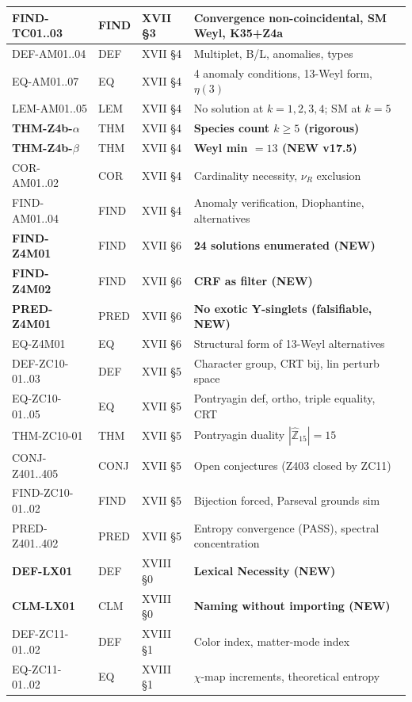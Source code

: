 \documentclass[12pt, a4paper]{article}
\begin{document}
\begin{center}
{\begin{longtable}{p{3.5cm} p{2.0cm} p{2.5cm} p{4.5cm}}
FIND-TC01..03   & FIND & XVII §3 & Convergence non-coincidental, SM Weyl, K35+Z4a \\
\midrule
DEF-AM01..04    & DEF & XVII §4 & Multiplet, B/L, anomalies, types \\
EQ-AM01..07     & EQ  & XVII §4 & 4 anomaly conditions, 13-Weyl form, $\eta(3)$ \\
LEM-AM01..05    & LEM & XVII §4 & No solution at $k=1,2,3,4$; SM at $k=5$ \\
\textbf{THM-Z4b-$\alpha$}  & THM & XVII §4 & \textbf{Species count $k\geq 5$ (rigorous)} \\
\textbf{THM-Z4b-$\beta$}   & THM & XVII §4 & \textbf{Weyl min $=13$ (NEW v17.5)} \\
COR-AM01..02    & COR & XVII §4 & Cardinality necessity, $\nu_R$ exclusion \\
FIND-AM01..04   & FIND & XVII §4 & Anomaly verification, Diophantine, alternatives \\
\midrule
\textbf{FIND-Z4M01}  & FIND & XVII §6 & \textbf{24 solutions enumerated (NEW)} \\
\textbf{FIND-Z4M02}  & FIND & XVII §6 & \textbf{CRF as filter (NEW)} \\
\textbf{PRED-Z4M01}  & PRED & XVII §6 & \textbf{No exotic Y-singlets (falsifiable, NEW)} \\
EQ-Z4M01        & EQ  & XVII §6 & Structural form of 13-Weyl alternatives \\
\midrule
DEF-ZC10-01..03 & DEF & XVII §5 & Character group, CRT bij, lin perturb space \\
EQ-ZC10-01..05  & EQ  & XVII §5 & Pontryagin def, ortho, triple equality, CRT \\
THM-ZC10-01     & THM & XVII §5 & Pontryagin duality $|\widehat{\mathbb{Z}}_{15}|=15$ \\
CONJ-Z401..405  & CONJ & XVII §5 & Open conjectures (Z403 closed by ZC11) \\
FIND-ZC10-01..02 & FIND & XVII §5 & Bijection forced, Parseval grounds sim \\
PRED-Z401..402  & PRED & XVII §5 & Entropy convergence (PASS), spectral concentration \\
\midrule
\textbf{DEF-LX01}    & DEF & XVIII §0 & \textbf{Lexical Necessity (NEW)} \\
\textbf{CLM-LX01}    & CLM & XVIII §0 & \textbf{Naming without importing (NEW)} \\
\midrule
DEF-ZC11-01..02 & DEF & XVIII §1 & Color index, matter-mode index \\
EQ-ZC11-01..02  & EQ  & XVIII §1 & $\chi$-map increments, theoretical entropy \\

\end{longtable}}
\end{center}
\end{document}
